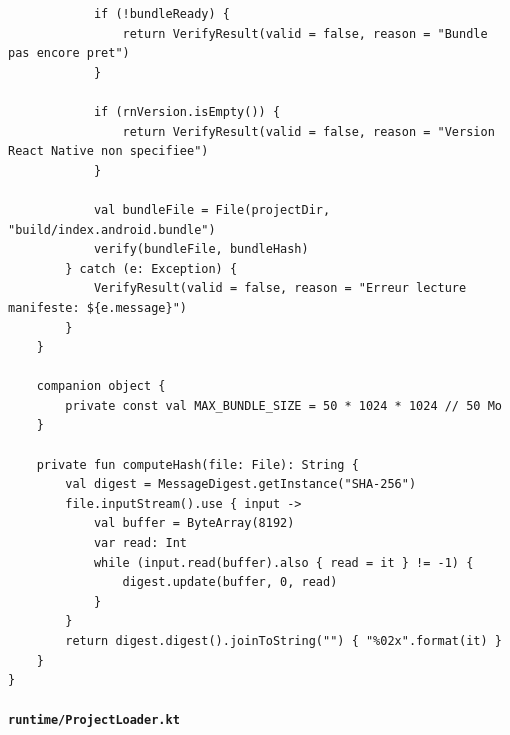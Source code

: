 \documentclass[11pt]{article}
\begin{document}
\begin{verbatim}
            if (!bundleReady) {
                return VerifyResult(valid = false, reason = "Bundle pas encore pret")
            }

            if (rnVersion.isEmpty()) {
                return VerifyResult(valid = false, reason = "Version React Native non specifiee")
            }

            val bundleFile = File(projectDir, "build/index.android.bundle")
            verify(bundleFile, bundleHash)
        } catch (e: Exception) {
            VerifyResult(valid = false, reason = "Erreur lecture manifeste: ${e.message}")
        }
    }

    companion object {
        private const val MAX_BUNDLE_SIZE = 50 * 1024 * 1024 // 50 Mo
    }

    private fun computeHash(file: File): String {
        val digest = MessageDigest.getInstance("SHA-256")
        file.inputStream().use { input ->
            val buffer = ByteArray(8192)
            var read: Int
            while (input.read(buffer).also { read = it } != -1) {
                digest.update(buffer, 0, read)
            }
        }
        return digest.digest().joinToString("") { "%02x".format(it) }
    }
}
\end{verbatim}

\paragraph{\texttt{runtime/ProjectLoader.kt}}
\end{document}
